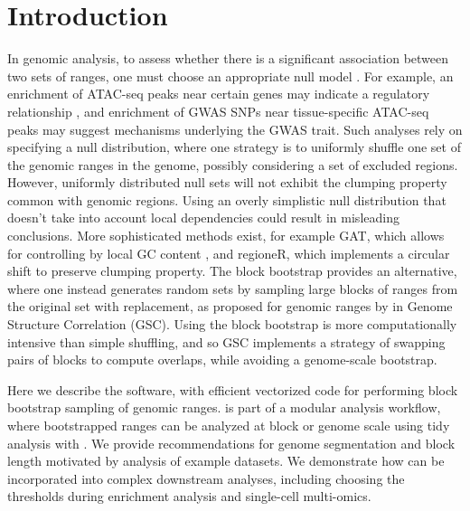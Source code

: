 \section{Introduction}

In genomic analysis, to assess whether
there is a significant association between two sets of ranges, 
one must choose an appropriate null model \citep{reviewdilemma2014,kanduri2018}.
For example, an enrichment of ATAC-seq peaks near certain genes
may indicate a regulatory relationship \citep{lee2020fluent}, 
and enrichment of GWAS SNPs near tissue-specific ATAC-seq peaks may
suggest mechanisms underlying the GWAS trait.
Such analyses rely on specifying a null distribution, where one
strategy is to uniformly shuffle one set of the
genomic ranges in the genome, possibly considering a set of
excluded regions.
However, uniformly distributed null sets will not exhibit the
clumping property common with genomic regions.
Using an overly simplistic null distribution that doesn't take into
account local dependencies could result in misleading conclusions.
More sophisticated methods exist, for example
GAT, which allows for controlling by local GC content
\citep{GAT_2013}, and regioneR, which implements a circular shift to
preserve clumping property\citep{gel2016regioner}.
The block bootstrap \citep{politis1999subsampling}
provides an alternative, where one instead generates
random sets by sampling large blocks of ranges from the
original set with replacement, as proposed for 
genomic ranges by \citet{bickel2010subsampling} in Genome Structure
Correlation (GSC).
Using the block bootstrap is more
computationally intensive than simple shuffling, and so GSC implements
a strategy of swapping pairs of blocks to compute overlaps, while
avoiding a genome-scale bootstrap.

Here we describe the \bootranges software, with efficient
vectorized code for performing block bootstrap sampling of genomic ranges.
\bootranges is part of a modular analysis workflow, where bootstrapped
ranges can be analyzed at block or genome scale using tidy
analysis with \plyranges \citep{lee2019plyranges}.
We provide recommendations for genome segmentation and block length
motivated by analysis of example datasets.
We demonstrate how \bootranges can be incorporated into complex
downstream analyses, including choosing the thresholds during
enrichment analysis and single-cell multi-omics.


